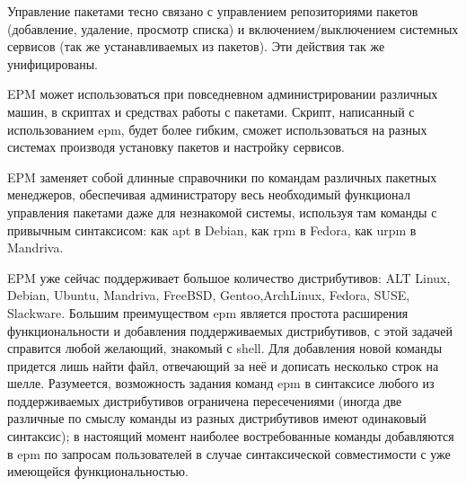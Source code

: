 \documentclass[10pt, a5paper]{article}
\begin{document}
Управление пакетами тесно связано с управлением репозиториями пакетов (добавление, удаление, просмотр списка) и включением/выключением системных сервисов (так же устанавливаемых из пакетов). Эти действия так же унифицированы.

EPM может использоваться при повседневном администрировании различных машин, в скриптах и средствах работы с пакетами. Скрипт, написанный с использованием epm, будет более гибким, сможет использоваться на разных системах производя установку пакетов и настройку сервисов.

EPM заменяет собой длинные справочники по командам различных пакетных менеджеров, обеспечивая администратору весь необходимый функционал управления пакетами даже для незнакомой системы, используя там команды с привычным синтаксисом: как apt в Debian, как rpm в Fedora, как urpm в Mandriva.

EPM уже сейчас поддерживает большое количество дистрибутивов: ALT Linux, Debian, Ubuntu, Mandriva, FreeBSD, Gentoo,\linebreak ArchLinux, Fedora, SUSE, Slackware. Большим преимуществом epm является простота расширения функциональности и добавления поддерживаемых  дистрибутивов, с этой задачей справится любой желающий, знакомый с shell. Для добавления новой команды придется лишь найти файл, отвечающий за неё и дописать несколько строк на шелле.
Разумеется, возможность задания команд epm в синтаксисе любого из поддерживаемых дистрибутивов ограничена пересечениями (иногда две различные по смыслу команды из разных дистрибутивов имеют одинаковый синтаксис); в настоящий момент наиболее востребованные команды добавляются в epm по запросам пользователей в случае синтаксической совместимости с уже имеющейся функциональностью.
\end{document}
